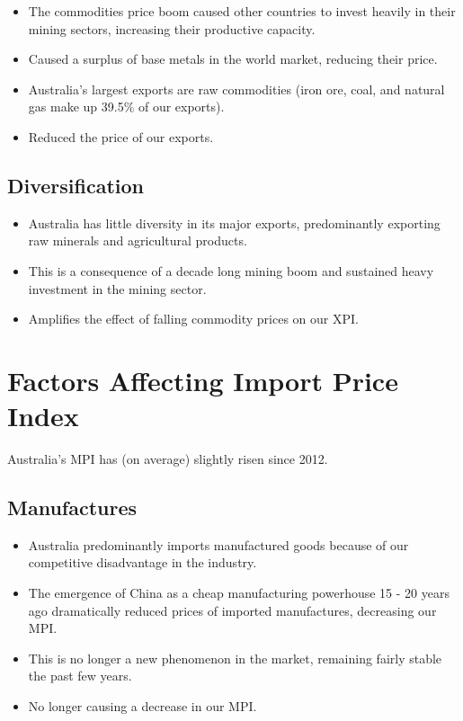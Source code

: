 \documentclass[a4paper,11pt]{article}
\begin{document}
\begin{itemize}
\item The commodities price boom caused other countries to invest heavily in
	their mining sectors, increasing their productive capacity.
\item Caused a surplus of base metals in the world market, reducing their
	price.
\item Australia's largest exports are raw commodities (iron ore, coal, and
	natural gas make up 39.5\% of our exports).
\item Reduced the price of our exports.
\end{itemize}


\subsection{Diversification}

\begin{itemize}
\item Australia has little diversity in its major exports, predominantly
	exporting raw minerals and agricultural products.
\item This is a consequence of a decade long mining boom and sustained heavy
	investment in the mining sector.
\item Amplifies the effect of falling commodity prices on our XPI.
\end{itemize}




\section{Factors Affecting Import Price Index}

Australia's MPI has (on average) slightly risen since 2012.


\subsection{Manufactures}

\begin{itemize}
\item Australia predominantly imports manufactured goods because of our
	competitive disadvantage in the industry.
\item The emergence of China as a cheap manufacturing powerhouse 15 - 20 years
	ago dramatically reduced prices of imported manufactures, decreasing our
	MPI.
\item This is no longer a new phenomenon in the market, remaining fairly stable
	the past few years.
\item No longer causing a decrease in our MPI.
\end{itemize}
\end{document}
